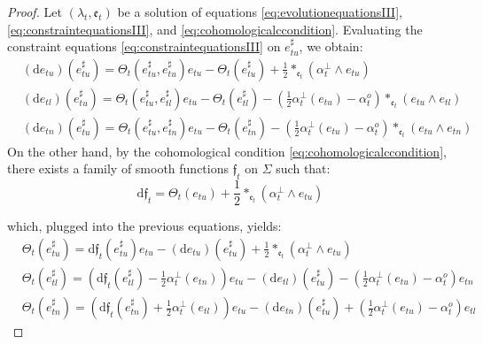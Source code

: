 \documentclass[10pt,reqno,a4paper]{amsart}
\theoremstyle{plain}
\theoremstyle{definition}
\theoremstyle{remark}
\theoremstyle{remark}
\def\dd{\mathrm{d}}
\def\fre{\mathfrak{e}}
\renewcommand{\(}{ (}
\renewcommand{\)}{ )}
\newcommand{\frf}{\mathfrak{f}}
\begin{document}
\begin{proof}
Let $(\lambda_t,\fre_t)$ be a solution of equations \eqref{eq:evolutionequationsIII}, \eqref{eq:constraintequationsIII}, and \eqref{eq:cohomologicalccondition}. Evaluating the constraint equations \eqref{eq:constraintequationsIII} on $e_{tu}^{\sharp}$, we obtain:
\begin{align*}
& (\dd e_{tu})(e_{tu}^{\sharp}) = \Theta_t (e_{tu}^{\sharp} , e_{tu}^{\sharp}) e_{tu} -\Theta_t(e_{tu}^{\sharp}) + \frac{1}{2} \ast_{\fre_t} (\alpha^{\perp}_t \wedge e_{tu})\\
& (\dd e_{tl})(e_{tu}^{\sharp}) = \Theta_t (e_{tu}^{\sharp} , e_{tl}^{\sharp}) e_{tu} - \Theta_t (e_{tl}^{\sharp}) - (\frac{1}{2}\alpha^{\perp}_t (e_{tu})  - \alpha^o_t) \ast_{\fre_t}(e_{tu}\wedge e_{tl}) \\
& (\dd e_{tn})(e_{tu}^{\sharp}) = \Theta_t (e_{tu}^{\sharp} , e_{tn}^{\sharp}) e_{tu} - \Theta_t (e_{tn}^{\sharp})- (\frac{1}{2}\alpha^{\perp}_t (e_{tu}) - \alpha^o_t) \ast_{\fre_t}(e_{tu}\wedge e_{tn}) 
\end{align*}
On the other hand, by the cohomological condition \eqref{eq:cohomologicalccondition}, there exists a family of smooth functions $\frf_t$ on $\Sigma$ such that:
\begin{equation}
\label{eq:frfdef}
\dd \frf_t = \Theta_t (e_{tu}) + \frac{1}{2}\ast_{\fre_t} (\alpha^{\perp}_t \wedge e_{tu})
\end{equation}

\noindent
which, plugged into the previous equations, yields:
\begin{align*}
& \Theta_t(e_{tu}^{\sharp})  = \dd\frf_t(e_{tu}^{\sharp}) e_{tu}  - (\dd e_{tu})(e_{tu}^{\sharp}) + \frac{1}{2}\ast_{\fre_t} (\alpha^{\perp}_t \wedge e_{tu})  \\
& \Theta_t (e_{tl}^{\sharp})  =( \dd\frf_t(e_{tl}^{\sharp}) - \frac{1}{2} \alpha^{\perp}_t(e_{tn})) e_{tu}   - (\dd e_{tl})(e_{tu}^{\sharp}) - (\frac{1}{2} \alpha^{\perp}_t (e_{tu}) - \alpha^o_t) e_{tn} \\
& \Theta_t (e_{tn}^{\sharp})   = ( \dd\frf_t(e_{tn}^{\sharp}) + \frac{1}{2} \alpha^{\perp}_t(e_{tl})) e_{tu}  -  (\dd e_{tn})(e_{tu}^{\sharp}) + (\frac{1}{2} \alpha^{\perp}_t (e_{tu}) - \alpha^o_t) e_{tl}
\end{align*}


\end{proof}
\end{document}
